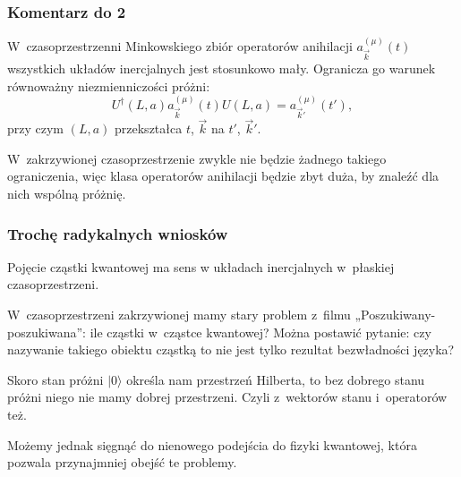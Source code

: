 \documentclass[10pt,t]{beamer}
\begin{document}
\begin{frame}
  \frametitle{Komentarz do 2}


  W~czasoprzestrzenni Minkowskiego zbiór operatorów anihilacji
  $a^{ ( \mu ) }_{ \vec{ k } }( t )$ wszystkich układów inercjalnych
  jest stosunkowo mały. Ogranicza go warunek równoważny
  niezmienniczości próżni:
  \begin{equation}
    \label{eq:Czemu-rozwazanie-10}
    U^{ \dagger }( L, a ) a^{ ( \mu ) }_{ \vec{ k } }( t ) U( L, a )
    =
    a^{ ( \mu ) }_{ \vec{ k }' }( t' ),
  \end{equation}
  przy czym $( L, a )$ przekształca $t$, $\vec{ k }$ na $t'$,
  $\vec{ k }'$.

  W~zakrzywionej czasoprzestrzenie zwykle nie będzie żadnego takiego
  ograniczenia, więc klasa operatorów anihilacji będzie zbyt duża, by
  znaleźć dla nich wspólną próżnię.

\end{frame}





\begin{frame}
  \frametitle{Trochę radykalnych wniosków}


  Pojęcie cząstki kwantowej ma sens w układach inercjalnych w~płaskiej
  czasoprzestrzeni.

  W~czasoprzestrzeni zakrzywionej mamy stary problem z~filmu
  „Poszukiwany-poszukiwana”: ile cząstki w~cząstce kwantowej? Można
  postawić pytanie: czy nazywanie takiego obiektu cząstką to nie jest
  tylko rezultat bezwładności języka?

  Skoro stan próżni $| 0 \rangle$ określa nam przestrzeń Hilberta, to bez
  dobrego stanu próżni niego nie mamy dobrej przestrzeni. Czyli
  z~wektorów stanu i~operatorów też.

  Możemy jednak sięgnąć do nienowego podejścia do fizyki kwantowej,
  która pozwala przynajmniej obejść te problemy.

\end{frame}
\end{document}
